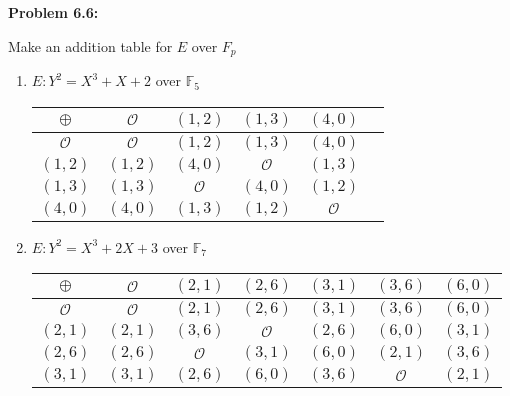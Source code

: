 \documentclass[a4paper, 11pt]{article}
\begin{document}
\noindent\textbf{Problem 6.6:}
    
    Make an addition table for $E$ over $F_p$
    \begin{enumerate}[label=(\alph*)]
        \item $E: Y^2 = X^3 + X + 2$ over $\mathbb{F}_5$\\
        \begin{tabular}{|c|c|c|c|c|c|} 
             \hline
                $\oplus$        &   $\mathcal{O}$   &   $(1,2)$         &   $(1,3)$         &   $(4,0)$\\ 
             \hline
                $\mathcal{O}$   &   $\mathcal{O}$   &   $(1,2)$         &   $(1,3)$         &   $(4,0)$\\ 
            \hline
                $(1,2)$         &   $(1,2)$         &   $(4,0)$         &   $\mathcal{O}$   &   $(1,3)$\\ 
            \hline
                $(1,3)$         &   $(1,3)$         &   $\mathcal{O}$   &   $(4,0)$         &   $(1,2)$\\ 
            \hline
                $(4,0)$         &   $(4,0)$         &   $(1,3)$         &   $(1,2)$         &   $\mathcal{O}$\\ 
            \hline
        \end{tabular}
        \item $E: Y^2 = X^3 + 2X + 3$ over $\mathbb{F}_7$\\
        \begin{tabular}{|c|c|c|c|c|c|c|} 
             \hline
                $\oplus$        &   $\mathcal{O}$   &   $(2,1)$         &   $(2,6)$         &   $(3,1)$         &   $(3,6)$         &   $(6,0)$\\ 
             \hline
                $\mathcal{O}$   &   $\mathcal{O}$   &   $(2,1)$         &   $(2,6)$         &   $(3,1)$         &   $(3,6)$         &   $(6,0)$\\
            \hline
                $(2,1)$         &   $(2,1)$         &   $(3,6)$         &   $\mathcal{O}$   &   $(2,6)$         &   $(6,0)$         &   $(3,1)$\\ 
            \hline
                $(2,6)$         &   $(2,6)$         &   $\mathcal{O}$   &   $(3,1)$         &   $(6,0)$         &   $(2,1)$         &   $(3,6)$\\ 
            \hline
                $(3,1)$         &   $(3,1)$         &   $(2,6)$         &   $(6,0)$         &   $(3,6)$         &   $\mathcal{O}$   &   $(2,1)$\\ 
            \hline

\end{tabular}
\end{enumerate}
\end{document}

